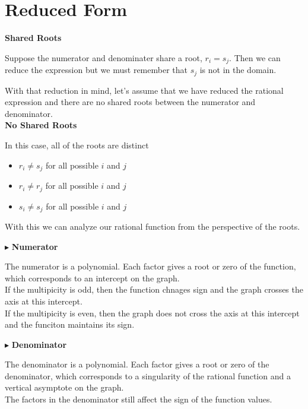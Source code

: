 \documentclass{ximera}
\begin{document}
\section{Reduced Form}

\textbf{Shared Roots}

Suppose the numerator and denominater share a root, $r_i = s_j$.  Then we can reduce the expression but we must remember that $s_j$ is not in the domain.


With that reduction in mind, let's assume that we have reduced the rational expression and there are no shared roots between the numerator and denominator. \\




\textbf{No Shared Roots}

In this case, all of the roots are distinct

\begin{itemize}
\item $r_i \ne s_j$ for all possible $i$ and $j$
\item $r_i \ne r_j$ for all possible $i$ and $j$
\item $s_i \ne s_j$ for all possible $i$ and $j$
\end{itemize}


With this we can analyze our rational function from the perspective of the roots.



$\blacktriangleright$ \textbf{Numerator}



The numerator is a polynomial.  Each factor gives a root or zero of the function, which corresponds to an intercept on the graph. \\

If the multipicity is odd, then the function chnages sign and the graph crosses the axis at this intercept.  \\
If the multipicity is even, then the graph does not cross the axis at this intercept and the funciton maintains its sign. 






$\blacktriangleright$ \textbf{Denominator}


The denominator is a polynomial.  Each factor gives a root or zero of the denominator, which corresponds to a singularity of the rational function and a vertical asymptote on the graph. \\


The factors in the denominator still affect the sign of the function values.
\end{document}
